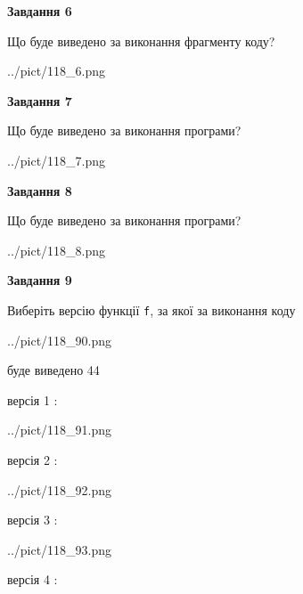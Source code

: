 \documentclass[12pt, ukrainian]{article}
\def\code#1{\Verb!#1!}
\begin{document}
{\begin {large}
{\begin {center}\textbf{Завдання 6}\end {center}}

Що буде виведено за виконання фрагменту коду?\par
\begin{center}
	{../pict/118_6.png}
\end{center}
\newpage

{\begin {center}\textbf{Завдання 7}\end {center}}

Що буде виведено за виконання програми?\par
\begin{center}
	{../pict/118_7.png}
\end{center}
\newpage

{\begin {center}\textbf{Завдання 8}\end {center}}

Що буде виведено за виконання програми?\par
\begin{center}
	{../pict/118_8.png}
\end{center}
\newpage

{\begin {center}\textbf{Завдання 9}\end {center}}

Виберіть версію функції \code{f}, за якої за виконання коду
\begin{center}
	{../pict/118_90.png}
\end{center}
буде виведено 44

\vspace{5mm}
версія 1 :

\begin{center}
	{../pict/118_91.png}
\end{center}
версія 2 :

\begin{center}
	{../pict/118_92.png}
\end{center}
версія 3 :

\begin{center}
	{../pict/118_93.png}
\end{center}
версія 4 :


\end{large}}
\end{document}
